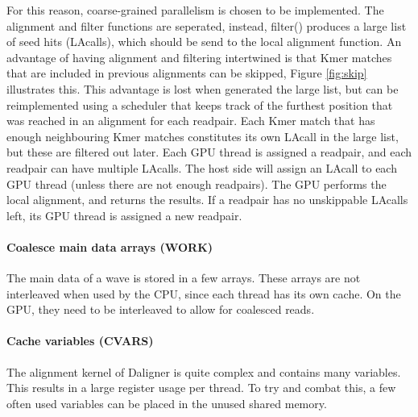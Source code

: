 \documentclass[../main/thesis.tex]{subfiles}
\begin{document}
For this reason, coarse-grained parallelism is chosen to be implemented.
The alignment and filter functions are seperated, instead, filter() produces a large list of seed hits (LAcalls), which should be send to the local alignment function.
An advantage of having alignment and filtering intertwined is that Kmer matches that are included in previous alignments can be skipped, Figure \ref{fig:skip} illustrates this.
This advantage is lost when generated the large list, but can be reimplemented using a scheduler that keeps track of the furthest position that was reached in an alignment for each readpair.
Each Kmer match that has enough neighbouring Kmer matches constitutes its own LAcall in the large list, but these are filtered out later.
Each GPU thread is assigned a readpair, and each readpair can have multiple LAcalls.
The host side will assign an LAcall to each GPU thread (unless there are not enough readpairs).
The GPU performs the local alignment, and returns the results.
If a readpair has no unskippable LAcalls left, its GPU thread is assigned a new readpair.




\paragraph{Coalesce main data arrays (WORK)}
The main data of a wave is stored in a few arrays.
These arrays are not interleaved when used by the CPU, since each thread has its own cache.
On the GPU, they need to be interleaved to allow for coalesced reads.

\paragraph{Cache variables (CVARS)}
The alignment kernel of Daligner is quite complex and contains many variables.
This results in a large register usage per thread.
To try and combat this, a few often used variables can be placed in the unused shared memory.

\end{document}
